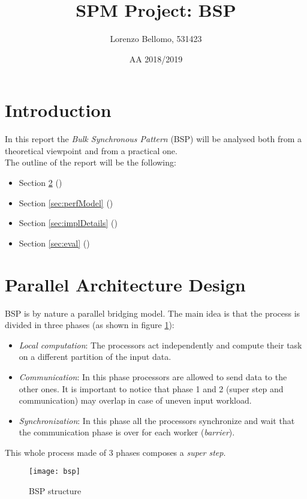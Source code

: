 \documentclass[]{article}
\title{SPM Project: BSP}
\author{Lorenzo Bellomo, 531423}
\date{AA 2018/2019}
\begin{document}
\maketitle

\section{Introduction}
In this report the \emph{Bulk Synchronous Pattern} (BSP) will be analysed both from a theoretical viewpoint and from a practical one. \\
The outline of the report will be the following:
\begin{itemize}
	\item Section \ref{sec:parDesign} ()
	\item Section \ref{sec:perfModel} ()
	\item Section \ref{sec:implDetails} ()
	\item Section \ref{sec:eval} ()
\end{itemize}

\section{Parallel Architecture Design}
\label{sec:parDesign}
BSP is by nature a parallel bridging model. The main idea is that the process is divided in three phases (as shown in figure \ref{fig:BSP}):
\begin{itemize}
	\item \emph{Local computation}: The processors act independently and compute their task on a different partition of the input data.
	\item \emph{Communication}: In this phase processors are allowed to send data to the other ones. It is important to notice that phase 1 and 2 (super step and communication) may overlap in case of uneven input workload.
	\item \emph{Synchronization}: In this phase all the processors synchronize and wait that the communication phase is over for each worker (\emph{barrier}).
\end{itemize}
This whole process made of 3 phases composes a \emph{super step}.
\begin{figure}[H]
	\centering
	\texttt{[image: bsp]}
	\caption{BSP structure}
	\label{fig:BSP}
\end{figure}
\end{document}
